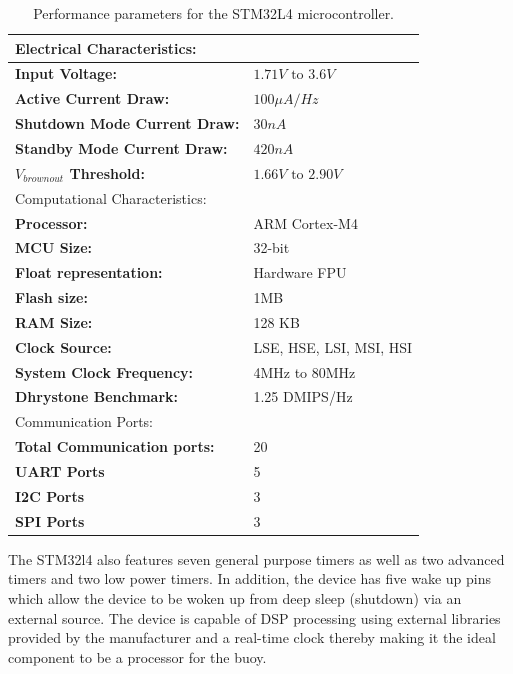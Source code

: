 \begin{table}[H]
	\centering
	\caption{Performance parameters for the STM32L4 microcontroller. }
	\begin{tabular}{|l | l|}
		\multicolumn{2}{l}{Electrical Characteristics:}\\
		\hline
		\textbf{Input Voltage: }    & $1.71V \text{ to } 3.6V$ \\
		\hline
		\textbf{Active Current Draw: }    & $100 \mu A/Hz$ \\
		\hline
		\textbf{Shutdown Mode Current Draw: }    &  $30nA$ \\
		\hline
		\textbf{Standby Mode Current Draw: }    &  $420nA$ \\
		\hline
		\textbf{$V_{brownout}$ Threshold:} &  $1.66V \text{ to } 2.90V$\\
		\hline
		\multicolumn{2}{l}{Computational Characteristics:}\\
		\hline
		\textbf{Processor: }    &  ARM Cortex-M4 \\
		\hline
		\textbf{MCU Size: }     & 32-bit\\
		\hline
		\textbf{Float representation: } & Hardware FPU \\
		\hline
		\textbf{Flash size: } & 1MB\\
		\hline
		\textbf{RAM Size:} & 128 KB\\
		\hline
		\textbf{Clock Source: } & LSE, HSE, LSI, MSI, HSI \\
		\hline
		\textbf{System Clock Frequency: } & 4MHz to 80MHz \\
		\hline
		\textbf{Dhrystone Benchmark: } & 1.25 DMIPS/Hz \\
		\hline
		\multicolumn{2}{l}{Communication Ports:} \\
		\hline
		\textbf{Total  Communication ports: } & 20 \\
		\hline
		\textbf{UART Ports} & 5 \\
		\hline
		\textbf{I2C Ports} & 3 \\
		\hline
		\textbf{SPI Ports} & 3 \\
		\hline
	\end{tabular}
	
	\label{tab:stm_spec}
\end{table}

The STM32l4 also features seven general purpose timers as well as two advanced timers and two low power timers. In addition, the device has five wake up pins which allow the device to be woken up from deep sleep (shutdown) via an external source. The device is capable of DSP processing using external libraries provided by the manufacturer and a real-time clock thereby making it the ideal component to be a processor for the buoy.

